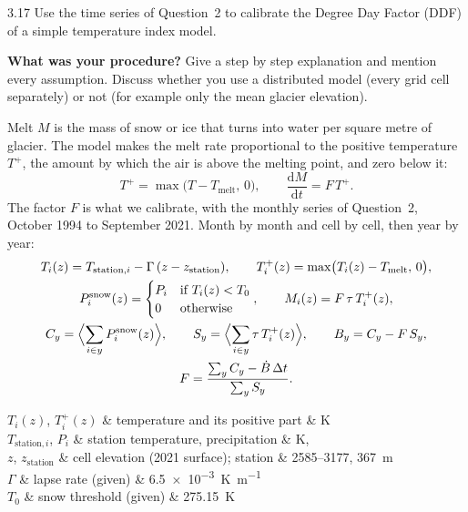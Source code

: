 \documentclass{scrartcl}
\renewcommand\unv[1]{#1}%
\begin{document}
\begin{reportpart}
\begin{question}{3.1}{7}\label{q:31}
Use the time series of Question~2 to calibrate the Degree Day Factor (DDF) of a simple
temperature index model.

\textbf{What was your procedure?} Give a step by step explanation and mention every assumption.
Discuss whether you use a distributed model (every grid cell separately) or not (for example
only the mean glacier elevation).
\end{question}

\unv{Melt $M$ is the mass of snow or ice that turns into water per square metre of glacier.
The model makes the melt rate proportional to the positive temperature $T^+$, the amount by
which the air is above the melting point, and zero below it:
\[
  T^+ = \max\bigl(T - T_\text{melt},\,0\bigr) , \qquad
  \frac{\mathrm{d}M}{\mathrm{d}t} = F\,T^+ .
\]
The factor $F$ is what we calibrate, with the monthly series of Question~2, October 1994 to
September 2021. Month by month and cell by cell, then year by year:
\begin{gather*}
  T_i(z) = T_{\text{station},i} - \Gamma\,(z - z_\text{station}) , \qquad
  T^+_i(z) = \max\bigl(T_i(z) - T_\text{melt},\,0\bigr) , \\
  P^\text{snow}_i(z) = \begin{cases} P_i & \text{if } T_i(z) < T_0 \\ 0 & \text{otherwise} \end{cases} , \qquad
  M_i(z) = F\,\tau\,T^+_i(z) , \\
  C_y = \Bigl\langle \sum_{i \in y} P^\text{snow}_i(z) \Bigr\rangle , \qquad
  S_y = \Bigl\langle \sum_{i \in y} \tau\,T^+_i(z) \Bigr\rangle , \qquad
  B_y = C_y - F\,S_y , \\
  F = \frac{\sum_y C_y - \dot B\,\Delta t}{\sum_y S_y} .
\end{gather*}
\begin{symbols}
  $T_i(z)$, $T^+_i(z)$ & temperature and its positive part & \unit{\kelvin} \\
  $T_{\text{station},i}$, $P_i$ & station temperature, precipitation & \unit{\kelvin}, \unit{\areal} \\
  $z$, $z_\text{station}$ & cell elevation (2021 surface); station & \qtyrange{2585}{3177}{}, \qty{367}{\metre} \\
  $\Gamma$ & lapse rate (given) & \qty{6.5e-3}{\kelvin\per\metre} \\
  $T_0$ & snow threshold (given) & \qty{275.15}{\kelvin} \\

\end{symbols}}
\end{reportpart}
\end{document}
